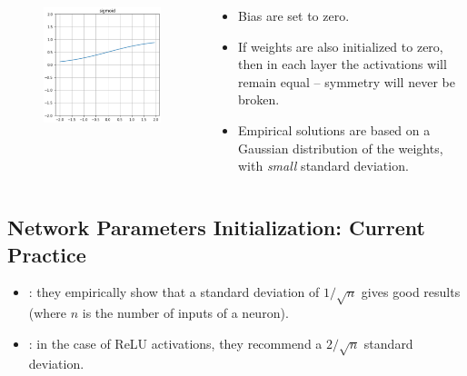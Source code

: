\documentclass{book}
\begin{document}
\begin{columns}
\begin{column}{.3\textwidth}
\begin{figure}[h]
\centering
\includegraphics[width=\textwidth]{act_sigm.png}
\end{figure}
\end{column}
\begin{column}{.7\textwidth}
\begin{itemize}
\item Bias are set to zero.
\item If weights are also initialized to zero, then in each layer the activations will remain equal -- symmetry will never be broken.
\item Empirical solutions are based on a Gaussian distribution of the weights, with \textit{small} standard deviation.
\end{itemize}
\end{column}
\end{columns}

\subsection{Network Parameters Initialization: Current Practice}

\begin{itemize}
\item \cite{glorot_understanding_2010}: they empirically show that a standard deviation of $1/\sqrt{n}$ gives good results (where $n$ is the number of inputs of a neuron).
\item \cite{he_delving_2015}: in the case of ReLU activations, they recommend a $2/\sqrt{n}$ standard deviation.
\end{itemize}
\end{document}
